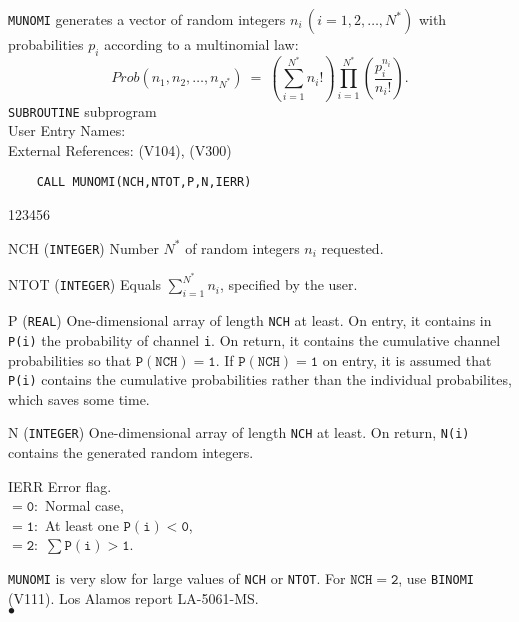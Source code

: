                        
                     
\Submitter{}                        
{\tt MUNOMI} generates a vector of random integers
$n_i \, (i=1,2,\ldots,N^*)$ with probabilities $p_i$
according to a multinomial law:
$$ Prob(n_1,n_2,\ldots,n_{N^*}) \ = \
\left( \sum_{i=1}^{N^*} n_i! \right)  \prod_{i=1}^{N^*}
\left( \frac {p_i^{n_{i}}} {n_i!} \right).$$
\Structure
{\tt SUBROUTINE} subprogram \\
User Entry Names: \\
External References: (V104), (V300)
\Usage
\begin{verbatim}
    CALL MUNOMI(NCH,NTOT,P,N,IERR)
\end{verbatim}
\begin{DLtt}{123456}
\item[NCH] ({\tt INTEGER}) Number $N^*$ of random integers $n_i$
requested.
\item[NTOT] ({\tt INTEGER}) Equals $\sum_{i=1}^{N^*} n_i$,
specified by the user.
\item[P] ({\tt REAL}) One-dimensional array of length {\tt NCH} at least.
On entry, it contains in {\tt P(i)} the probability of channel {\tt i}.
On return, it contains the cumulative channel probabilities so that
$\mathtt{P(NCH)=1}$. If $\mathtt{P(NCH)=1}$ on entry, it is assumed that
{\tt P(i)} contains the cumulative probabilities rather than the
individual probabilites, which saves some time.
\item[N] ({\tt INTEGER}) One-dimensional array of length {\tt NCH} at
least. On return, {\tt N(i)} contains the generated random integers.
\item[IERR] Error flag. \\
$\mathtt{= 0:}$ Normal case, \\
$\mathtt{= 1:}$ At least one $\mathtt{P(i) < 0}$, \\
$\mathtt{= 2:}$ $\sum \mathtt{P(i) > 1}$.
\end{DLtt}
\Notes
{\tt MUNOMI} is very slow for large values of {\tt NCH} or {\tt NTOT}.
For $\mathtt{NCH=2}$, use {\tt BINOMI} (V111).
\Source
Los Alamos report LA-5061-MS.
\\ $\bullet$
